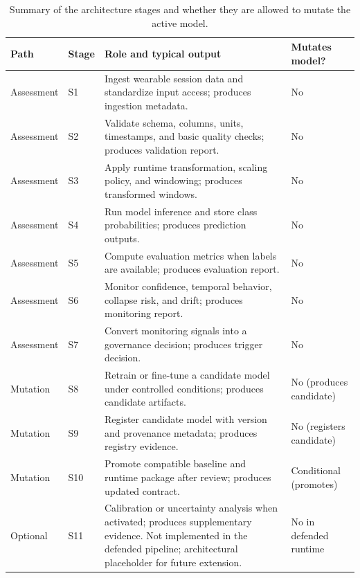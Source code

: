 \renewcommand{\arraystretch}{1.15}
\begin{table}[htbp]
\centering
\footnotesize
\caption[Summary of the architecture stages and whether they are allowed to...]{Summary of the architecture stages and whether they are allowed to mutate the active model.}
\label{tab:architecture_stage_summary}
\begin{tabularx}{\textwidth}{p{2.1cm} p{1.1cm} X p{2.1cm}}
\toprule
\textbf{Path} & \textbf{Stage} & \textbf{Role and typical output} & \textbf{Mutates model?} \\
\midrule
Assessment & S1 & Ingest wearable session data and standardize input access; produces ingestion metadata. & No \\
Assessment & S2 & Validate schema, columns, units, timestamps, and basic quality checks; produces validation report. & No \\
Assessment & S3 & Apply runtime transformation, scaling policy, and windowing; produces transformed windows. & No \\
Assessment & S4 & Run model inference and store class probabilities; produces prediction outputs. & No \\
Assessment & S5 & Compute evaluation metrics when labels are available; produces evaluation report. & No \\
Assessment & S6 & Monitor confidence, temporal behavior, collapse risk, and drift; produces monitoring report. & No \\
Assessment & S7 & Convert monitoring signals into a governance decision; produces trigger decision. & No \\
Mutation & S8 & Retrain or fine-tune a candidate model under controlled conditions; produces candidate artifacts. & No (produces candidate) \\
Mutation & S9 & Register candidate model with version and provenance metadata; produces registry evidence. & No (registers candidate) \\
Mutation & S10 & Promote compatible baseline and runtime package after review; produces updated contract. & Conditional (promotes) \\
Optional & S11 & Calibration or uncertainty analysis when activated; produces supplementary evidence. Not implemented in the defended pipeline; architectural placeholder for future extension. & No in defended runtime \\
\bottomrule
\end{tabularx}
\renewcommand{\arraystretch}{1.0}
\end{table}
\FloatBarrier

